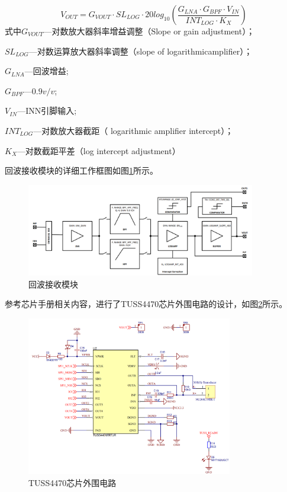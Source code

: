 \begin{equation}
	V_{OUT}=G_{VOUT} \cdot SL_{LOG}\cdot20log_{10}(\frac{G_{LNA} \cdot G_{BPF} \cdot V_{IN}}{INT_{LOG} \cdot K_X})
	\label{VOUT公式}
\end{equation}
式中\quad $G_{VOUT}$---对数放大器斜率增益调整（Slope or gain adjustment）；\par
\quad$SL_{LOG}$---对数运算放大器斜率调整（slope of logarithmicamplifier）；\par
\quad$G_{LNA}$---回波增益;\par
\quad$G_{BPF}$---$0.9v/v$;\par
\quad$V_{IN}$---INN引脚输入;\par
\quad$INT_{LOG}$---对数放大器截距（ logarithmic amplifier intercept）；\par
\quad$K_X$---对数截距平差（log intercept adjustment）\par
回波接收模块的详细工作框图如图\ref{回波接收模块}所示。
\begin{figure}[ht]
	\centering
	\includegraphics[width=10cm]{figure/Analog Front-End Block Diagram.png}
	\caption{回波接收模块}
	\label{回波接收模块}
\end{figure}\par

参考芯片手册相关内容，进行了TUSS4470芯片外围电路的设计，如图\ref{TUSS4470芯片外围电路}所示。
\begin{figure}[!h]
	\centering
	\includegraphics[width=9cm]{figure/TUSS4470 peripheral circuit.png}
	\caption{TUSS4470芯片外围电路}
	\label{TUSS4470芯片外围电路}
\end{figure}
\newpage
